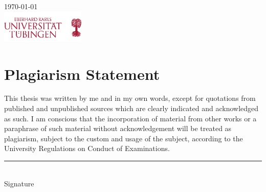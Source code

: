 \documentclass[a4paper, 12pt]{scrartcl}
\begin{document}
\begin{titlepage}


{\large \today}\\[1cm] %


\includegraphics[width=0.3\textwidth]{logo-uni-tuebingen.png}\\[1cm] %
 

\vfill %

\end{titlepage}
\section*{Plagiarism Statement} 
This thesis was written by me and in my own words, except for quotations from published and unpublished sources which are clearly indicated and acknowledged as such. I am conscious that the incorporation of material from other works or a paraphrase of such material without acknowledgement will be treated as plagiarism, subject to the custom and usage of the subject, according to the University Regulations on Conduct of Examinations.\\[5cm]
\noindent\rule{4cm}{0.4pt}\\
Signature
\newpage

\tableofcontents
\newpage
\end{document}
